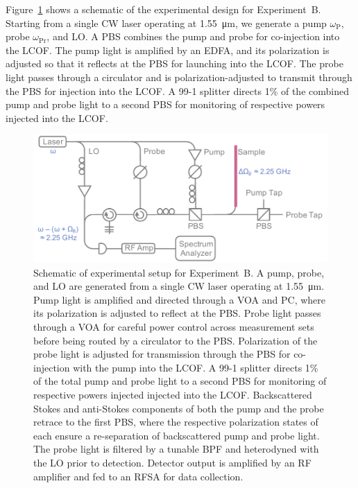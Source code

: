 Figure~\ref{fig:Cooling:ExperimentBDesign} shows a schematic of the experimental design for Experiment~B. Starting from a single \ac{CW} laser operating at \SI{1.55}{\micro\meter}, we generate a pump \(\omega_{\mathrm{P}}\), probe \(\omega_{\mathrm{Pr}}\), and \ac{LO}. A \ac{PBS} combines the pump and probe for co-injection into the \ac{LCOF}. The pump light is amplified by an \ac{EDFA}, and its polarization is adjusted so that it reflects at the \ac{PBS} for launching into the \ac{LCOF}. The probe light passes through a circulator and is polarization-adjusted to transmit through the \ac{PBS} for injection into the \ac{LCOF}. A 99-1 splitter directs 1\% of the combined pump and probe light to a second \ac{PBS} for monitoring of respective powers injected into the \ac{LCOF}.

\begin{figure}[t]
  \centering
  \includegraphics[width=\textwidth]{figs/3-Cooling/pumpProbeDesign.pdf}
  \caption{Schematic of experimental setup for Experiment~B. A pump, probe, and \ac{LO} are generated from a single \ac{CW} laser operating at \SI{1.55}{\micro\meter}. Pump light is amplified and directed through a \ac{VOA} and \ac{PC}, where its polarization is adjusted to reflect at the \ac{PBS}. Probe light passes through a \ac{VOA} for careful power control across measurement sets before being routed by a circulator to the \ac{PBS}. Polarization of the probe light is adjusted for transmission through the \ac{PBS} for co-injection with the pump into the \ac{LCOF}. A 99-1 splitter directs 1\% of the total pump and probe light to a second \ac{PBS} for monitoring of respective powers injected injected into the \ac{LCOF}. Backscattered Stokes and anti-Stokes components of both the pump and the probe retrace to the first \ac{PBS}, where the respective polarization states of each ensure a re-separation of backscattered pump and probe light. The probe light is filtered by a tunable \ac{BPF} and heterodyned with the \ac{LO} prior to detection. Detector output is amplified by an \ac{RF} amplifier and fed to an \ac{RFSA} for data collection.}
  \label{fig:Cooling:ExperimentBDesign}
\end{figure}

